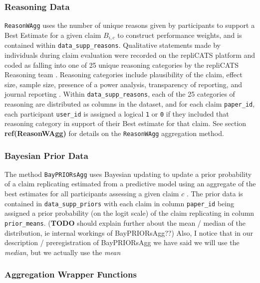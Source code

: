 \documentclass[article]{jss}
\begin{document}
\hypertarget{sec-reasonwagg-supplementary-data}{%
\subsubsection{Reasoning Data}\label{sec-reasonwagg-supplementary-data}}

\texttt{ReasonWAgg} uses the number of unique reasons given by
participants to support a Best Estimate for a given claim \(B_{i,c}\) to
construct performance weights, and is contained within
\texttt{data\_supp\_reasons}. Qualitative statements made by individuals
during claim evaluation were recorded on the repliCATS platform
\citep{Pearson2021} and coded as falling into one of 25 unique reasoning
categories by the repliCATS Reasoning team \citep{Wintle:2021}.
Reasoning categories include plausibility of the claim, effect size,
sample size, presence of a power analysis, transparency of reporting,
and journal reporting \citep{Hanea2021}. Within
\texttt{data\_supp\_reasons}, each of the 25 categories of reasoning are
distributed as columns in the dataset, and for each claim
\texttt{paper\_id}, each participant \texttt{user\_id} is assigned a
logical \texttt{1} or \texttt{0} if they included that reasoning
category in support of their Best estimate for that claim. See section
\textbf{ref(ReasonWAgg)} for details on the \texttt{ReasonWAgg}
aggregation method.

\hypertarget{sec-bayesian-supplementary-data}{%
\subsubsection{Bayesian Prior
Data}\label{sec-bayesian-supplementary-data}}

The method \texttt{BayPRIORsAgg} uses Bayesian updating to update a
prior probability of a claim replicating estimated from a predictive
model \citep{Gould2021a} using an aggregate of the best estimates for
all participants assessing a given claim \(c\) \citep{Hanea2021}. The
prior data is contained in \texttt{data\_supp\_priors} with each claim
in column \texttt{paper\_id} being assigned a prior probability (on the
logit scale) of the claim replicating in column \texttt{prior\_means}.
(\textbf{TODO} should explain further about the mean / median of the
distribution, ie internal workings of BayPRIORsAgg??) Also, I notice
that in our description / preregistration of BayPRIORsAgg we have said
we will use the \emph{median}, but we actually use the \emph{mean}

\hypertarget{aggregation-wrapper-functions}{%
\subsubsection{Aggregation Wrapper
Functions}\label{aggregation-wrapper-functions}}
\end{document}
